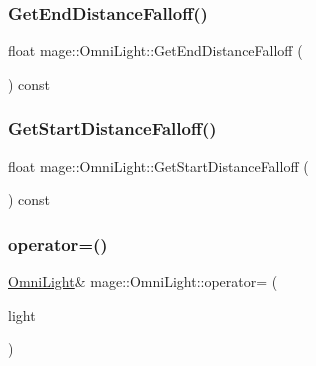 \subsubsection{\texorpdfstring{Get\+End\+Distance\+Falloff()}{GetEndDistanceFalloff()}}
{\footnotesize\ttfamily float mage\+::\+Omni\+Light\+::\+Get\+End\+Distance\+Falloff (\begin{DoxyParamCaption}{ }\end{DoxyParamCaption}) const}

\hypertarget{classmage_1_1_omni_light_ab37a3e3880f519f40f9c9eaa786ba769}{}\label{classmage_1_1_omni_light_ab37a3e3880f519f40f9c9eaa786ba769} 
\subsubsection{\texorpdfstring{Get\+Start\+Distance\+Falloff()}{GetStartDistanceFalloff()}}
{\footnotesize\ttfamily float mage\+::\+Omni\+Light\+::\+Get\+Start\+Distance\+Falloff (\begin{DoxyParamCaption}{ }\end{DoxyParamCaption}) const}

\hypertarget{classmage_1_1_omni_light_a4928e08d5e5168b2eede7ecc84b1686d}{}\label{classmage_1_1_omni_light_a4928e08d5e5168b2eede7ecc84b1686d} 
\subsubsection{\texorpdfstring{operator=()}{operator=()}\hspace{0.1cm}{\footnotesize\ttfamily [1/2]}}
{\footnotesize\ttfamily \hyperlink{classmage_1_1_omni_light}{Omni\+Light}\& mage\+::\+Omni\+Light\+::operator= (\begin{DoxyParamCaption}\item[{const \hyperlink{classmage_1_1_omni_light}{Omni\+Light} \&}]{light }\end{DoxyParamCaption})\hspace{0.3cm}{\ttfamily [delete]}}

\hypertarget{classmage_1_1_omni_light_a530be023cc5eb9a0dd795da3aa40934e}{}\label{classmage_1_1_omni_light_a530be023cc5eb9a0dd795da3aa40934e} 
